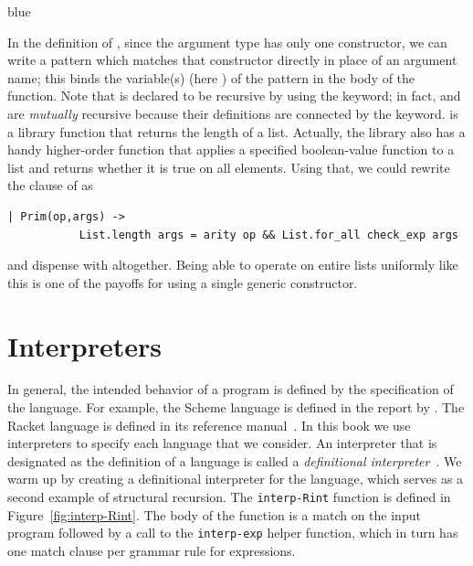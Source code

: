 \documentclass[11pt]{book}
\newcommand{\ocaml}[1]{{\color{blue}{#1}}}
\newenvironment{ocamlx}{
  \begin{color}{blue}
}
{
  \end{color}
}
\begin{document}
\begin{ocamlx}
In the definition of , since the argument type 
has only one constructor, we can write a pattern  which matches that constructor directly in
place of an argument name; this binds the variable(s) (here ) of the pattern in the body of the function.
Note that  is declared to be recursive by using the  keyword;
in fact,  and  are \emph{mutually} recursive because
their definitions are connected by the  keyword.  is a library
function that returns the length of a list.  Actually, the library also has a handy higher-order
function  that applies a specified boolean-value function to a list and returns
whether it is true on all elements.  Using that, we could rewrite the 
clause of  as
\begin{lstlisting}[style=ocaml]
  | Prim(op,args) ->
           List.length args = arity op && List.for_all check_exp args
\end{lstlisting}
and dispense with  altogether.  Being able to operate on entire lists
uniformly like this is one of the payoffs for using a single generic  constructor.
\end{ocamlx}
  

\section{Interpreters}
\label{sec:interp-Rint}

In general, the intended behavior of a program is defined by the
specification of the language. For example, the Scheme language is
defined in the report by \cite{SPERBER:2009aa}. The Racket language is
defined in its reference manual~\citep{plt-tr}. In this book we use
interpreters to specify each language that we consider. An interpreter
that is designated as the definition of a language is called a
\emph{definitional interpreter}~\citep{reynolds72:_def_interp}.
 We warm up by creating a definitional
interpreter for the \LangInt{} language, which serves as a second example
of structural recursion. The \texttt{interp-Rint} function is defined in
Figure~\ref{fig:interp-Rint}. The body of the function is a match on the
input program followed by a call to the \lstinline{interp-exp} helper
function, which in turn has one match clause per grammar rule for
\LangInt{} expressions. \ocaml{The OCaml version is in Figure~\ref{fig:ocaml-interp-Rint}.}
\end{document}
